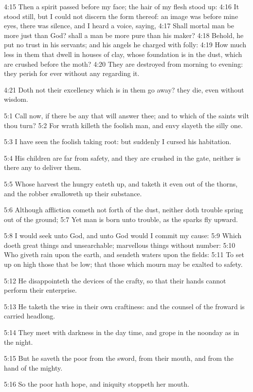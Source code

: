 4:15 Then a spirit passed before my face; the hair of my flesh stood up: 4:16 It stood still, but I could not discern the form thereof: an image was before mine eyes, there was silence, and I heard a voice, saying, 4:17 Shall mortal man be more just than God? shall a man be more pure than his maker?  4:18 Behold, he put no trust in his servants; and his angels he charged with folly: 4:19 How much less in them that dwell in houses of clay, whose foundation is in the dust, which are crushed before the moth?  4:20 They are destroyed from morning to evening: they perish for ever without any regarding it.

4:21 Doth not their excellency which is in them go away? they die, even without wisdom.

5:1 Call now, if there be any that will answer thee; and to which of the saints wilt thou turn?  5:2 For wrath killeth the foolish man, and envy slayeth the silly one.

5:3 I have seen the foolish taking root: but suddenly I cursed his habitation.

5:4 His children are far from safety, and they are crushed in the gate, neither is there any to deliver them.

5:5 Whose harvest the hungry eateth up, and taketh it even out of the thorns, and the robber swalloweth up their substance.

5:6 Although affliction cometh not forth of the dust, neither doth trouble spring out of the ground; 5:7 Yet man is born unto trouble, as the sparks fly upward.

5:8 I would seek unto God, and unto God would I commit my cause: 5:9 Which doeth great things and unsearchable; marvellous things without number: 5:10 Who giveth rain upon the earth, and sendeth waters upon the fields: 5:11 To set up on high those that be low; that those which mourn may be exalted to safety.

5:12 He disappointeth the devices of the crafty, so that their hands cannot perform their enterprise.

5:13 He taketh the wise in their own craftiness: and the counsel of the froward is carried headlong.

5:14 They meet with darkness in the day time, and grope in the noonday as in the night.

5:15 But he saveth the poor from the sword, from their mouth, and from the hand of the mighty.

5:16 So the poor hath hope, and iniquity stoppeth her mouth.

